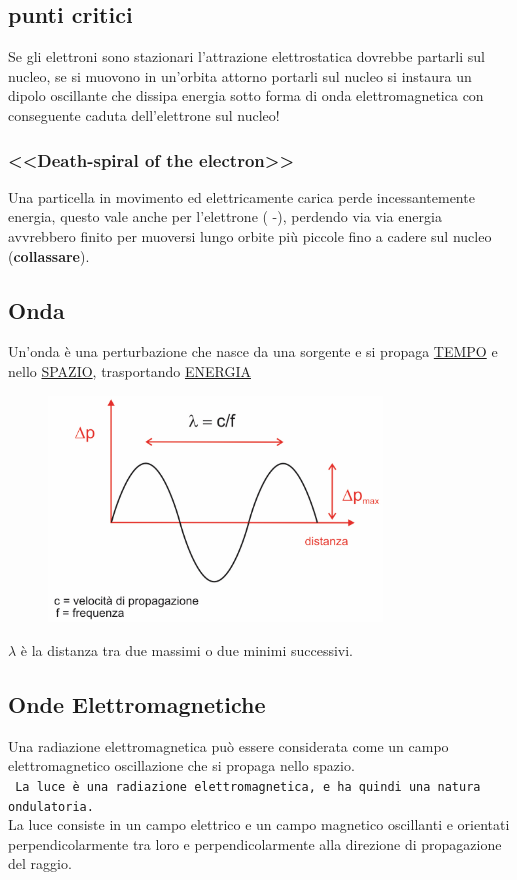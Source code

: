 \documentclass{book}
\begin{document}
\subsection {punti critici}
Se gli elettroni sono stazionari l'attrazione elettrostatica dovrebbe partarli sul nucleo, se si muovono in un'orbita attorno portarli sul nucleo si instaura un dipolo oscillante che dissipa energia sotto forma di onda elettromagnetica con conseguente caduta dell'elettrone sul nucleo!
\subsubsection{<<Death-spiral of the electron>>}
Una particella in movimento ed elettricamente carica perde incessantemente energia, questo vale anche per l'elettrone ({\color{red} -}), perdendo via via energia avvrebbero finito per muoversi lungo orbite più piccole fino a cadere sul nucleo (\textbf{collassare}).
\subsection{Onda}
Un'onda è una perturbazione che nasce da una sorgente e si propaga \underline{TEMPO} e nello \underline{SPAZIO}, trasportando \underline{ENERGIA}
\begin{figure}[!h]
  	\centering
	\includegraphics[height=6cm]{img/onda.png}
\end{figure}
$\lambda$ è la distanza tra due massimi o due minimi successivi.
\subsection{Onde Elettromagnetiche}
Una radiazione elettromagnetica può essere considerata come un campo elettromagnetico oscillazione che si propaga nello spazio.\\
\texttt{\color{red} La luce è una radiazione elettromagnetica, e ha quindi una natura ondulatoria.}\\
La luce consiste in un campo elettrico e un campo magnetico oscillanti e orientati perpendicolarmente tra loro e perpendicolarmente alla direzione di propagazione del raggio.
\end{document}
